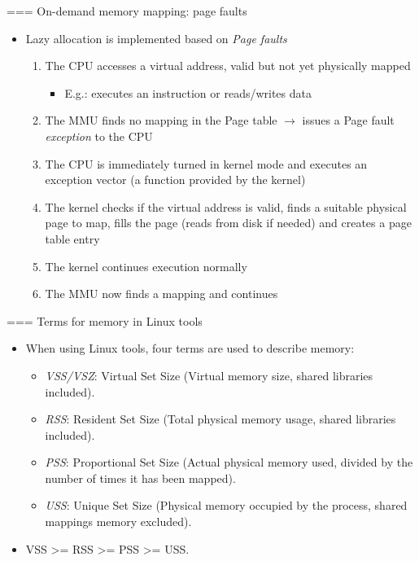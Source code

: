 === On-demand memory mapping: page faults
  \begin{itemize}
    \item Lazy allocation is implemented based on {\em Page faults}
    \begin{enumerate}
      \item The CPU accesses a virtual address, valid but not yet
        physically mapped
        \begin{itemize}
        \item E.g.: executes an instruction or reads/writes data
        \end{itemize}
      \item The MMU finds no mapping in the Page table $\rightarrow$ issues
        a Page fault {\em exception} to the CPU
      \item The CPU is immediately turned in kernel mode and executes an
        exception vector (a function provided by the kernel)
      \item The kernel checks if the virtual address is valid, finds a
        suitable physical page to map, fills the page (reads from disk if
        needed) and creates a page table entry
      \item The kernel continues execution normally
      \item The MMU now finds a mapping and continues
    \end{enumerate}
  \end{itemize}


=== Terms for memory in Linux tools
  \begin{itemize}
    \item When using Linux tools, four terms are used to describe memory:
    \begin{itemize}
      \item {\em VSS/VSZ}: Virtual Set Size (Virtual memory size, shared libraries
            included).
      \item {\em RSS}: Resident Set Size (Total physical memory usage, shared
            libraries included).
      \item {\em PSS}: Proportional Set Size (Actual physical memory used, divided
            by the number of times it has been mapped).
      \item {\em USS}: Unique Set Size (Physical memory occupied by the process,
            shared mappings memory excluded).
    \end{itemize}
    \item VSS >= RSS >= PSS >= USS.
  \end{itemize}


